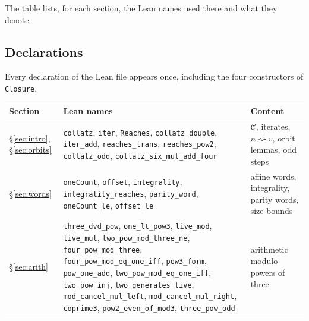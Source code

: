 \documentclass[11pt,reqno,oneside]{amsart}
\theoremstyle{plain}
\theoremstyle{definition}
\numberwithin{equation}{section}
\newcommand{\lean}[1]{\texttt{#1}}
\begin{document}
The table lists, for each section, the Lean names used there and what they denote.

\subsection*{Declarations}
Every declaration of the Lean file appears once, including the four constructors of \lean{Closure}.

{\small\raggedright\sloppy
\begin{longtable}{@{}>{\raggedright\arraybackslash}p{}>{\raggedright\arraybackslash}p{}>{\raggedright\arraybackslash}p{}@{}}
\toprule
Section & Lean names & Content\\
\midrule
\endhead
\S\ref{sec:intro}, \S\ref{sec:orbits} & \lean{collatz}, \lean{iter}, \lean{Reaches}, \lean{collatz\_\allowbreak{}double}, \lean{iter\_\allowbreak{}add}, \lean{reaches\_\allowbreak{}trans}, \lean{reaches\_\allowbreak{}pow2}, \lean{collatz\_\allowbreak{}odd}, \lean{collatz\_\allowbreak{}six\_\allowbreak{}mul\_\allowbreak{}add\_\allowbreak{}four} & $\mathcal C$, iterates, $n\rightsquigarrow v$, orbit lemmas, odd steps \\
\S\ref{sec:words} & \lean{oneCount}, \lean{offset}, \lean{integrality}, \lean{integrality\_\allowbreak{}reaches}, \lean{parity\_\allowbreak{}word}, \lean{oneCount\_\allowbreak{}le}, \lean{offset\_\allowbreak{}le} & affine words, integrality, parity words, size bounds \\
\S\ref{sec:arith} & \lean{three\_\allowbreak{}dvd\_\allowbreak{}pow}, \lean{one\_\allowbreak{}lt\_\allowbreak{}pow3}, \lean{live\_\allowbreak{}mod}, \lean{live\_\allowbreak{}mul}, \lean{two\_\allowbreak{}pow\_\allowbreak{}mod\_\allowbreak{}three\_\allowbreak{}ne}, \lean{four\_\allowbreak{}pow\_\allowbreak{}mod\_\allowbreak{}three}, \lean{four\_\allowbreak{}pow\_\allowbreak{}mod\_\allowbreak{}eq\_\allowbreak{}one\_\allowbreak{}iff}, \lean{pow3\_\allowbreak{}form}, \lean{pow\_\allowbreak{}one\_\allowbreak{}add}, \lean{two\_\allowbreak{}pow\_\allowbreak{}mod\_\allowbreak{}eq\_\allowbreak{}one\_\allowbreak{}iff}, \lean{two\_\allowbreak{}pow\_\allowbreak{}inj}, \lean{two\_\allowbreak{}generates\_\allowbreak{}live}, \lean{mod\_\allowbreak{}cancel\_\allowbreak{}mul\_\allowbreak{}left}, \lean{mod\_\allowbreak{}cancel\_\allowbreak{}mul\_\allowbreak{}right}, \lean{coprime3}, \lean{pow2\_\allowbreak{}even\_\allowbreak{}of\_\allowbreak{}mod3}, \lean{three\_\allowbreak{}pow\_\allowbreak{}odd} & arithmetic modulo powers of three \\

\end{longtable}}
\end{document}
